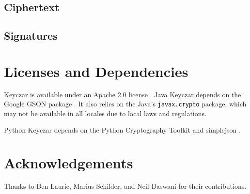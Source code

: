 \documentclass{llncs}
\begin{document}
\subsection{Ciphertext}
\subsection{Signatures}

\section{Licenses and Dependencies}

Keyczar is available under an Apache 2.0 license \cite{apache2}. Java Keyczar
depends on the Google GSON package \cite{google-gson}. It also relies on the
Java's {\tt javax.crypto} package, which may not be available in  all locales
due to local laws and regulations.

Python Keyczar depends on the Python Cryptography Toolkit \cite{python-crypto}
and simplejson \cite{simplejson}. 

\section{Acknowledgements}

Thanks to Ben Laurie, Marius Schilder, and Neil Daswani for their
contributions.



\end{document}

